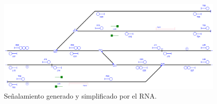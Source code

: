     \begin{figure}[h]
        \centering
        \includegraphics[width=1\textwidth]{resultados-obtenidos/ejemplo1/images/1_RNA.png}
        \centering\caption{Señalamiento generado y simplificado por el RNA.}
    \end{figure}
    
    
    
    
    